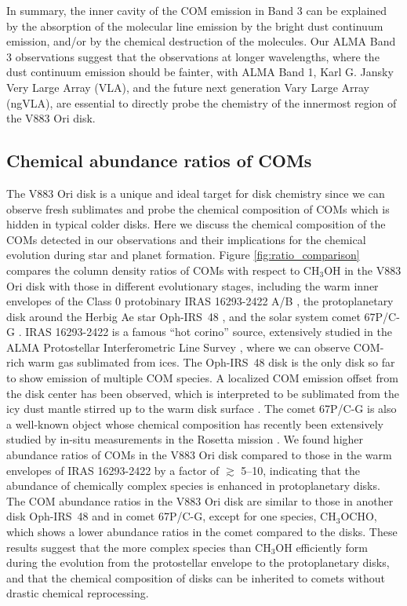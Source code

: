 \documentclass[linenumbers, twocolumn, twocolappendix, astrosymb, times]{aastex631}
\newcommand{\methanol}{CH$_3$OH\xspace}
\newcommand{\methylformate}{CH$_3$OCHO\xspace}
\begin{document}
In summary, the inner cavity of the COM emission in Band 3 can be explained by the absorption of the molecular line emission by the bright dust continuum emission, and/or by the chemical destruction of the molecules. Our ALMA Band 3 observations suggest that the observations at longer wavelengths, where the dust continuum emission should be fainter, with ALMA Band 1, Karl G. Jansky Very Large Array (VLA), and the future next generation Vary Large Array (ngVLA), are essential to directly probe the chemistry of the innermost region of the V883 Ori disk.

\subsection{Chemical abundance ratios of COMs}\label{subsec:abundance_ratio}
The V883 Ori disk is a unique and ideal target for disk chemistry since we can observe fresh sublimates and probe the chemical composition of COMs which is hidden in typical colder disks. Here we discuss the chemical composition of the COMs detected in our observations and their implications for the chemical evolution during star and planet formation. 
Figure \ref{fig:ratio_comparison} compares the column density ratios of COMs with respect to \methanol in the V883 Ori disk with those in different evolutionary stages, including the warm inner envelopes of the Class 0 protobinary IRAS 16293-2422 A/B \citep[][see also \citealt{Drozdovskaya2019}]{Lykke2017, Jorgensen2018, Manigand2020, Manigand2021}, the protoplanetary disk around the Herbig Ae star Oph-IRS~48 \citep{Brunken2022}, and the solar system comet 67P/C-G \citep[][see also \citealt{Drozdovskaya2019}]{Rubin2019, Schuhmann2019}. IRAS 16293-2422 is a famous ``hot corino'' source, extensively studied in the ALMA Protostellar Interferometric Line Survey \citep[PILS;][]{Jorgensen2016}, where we can observe COM-rich warm gas sublimated from ices. The Oph-IRS~48 disk is the only disk so far to show emission of multiple COM species. A localized COM emission offset from the disk center has been observed, which is interpreted to be sublimated from the icy dust mantle stirred up to the warm disk surface \citep{vanderMarel2021, Brunken2022}. The comet 67P/C-G is also a well-known object whose chemical composition has recently been extensively studied by in-situ measurements in the Rosetta mission \citep[e.g.,][]{Altwegg2019}. We found higher abundance ratios of COMs in the V883 Ori disk compared to those in the warm envelopes of IRAS 16293-2422 by a factor of $\gtrsim$ 5--10, indicating that the abundance of chemically complex species is enhanced in protoplanetary disks. The COM abundance ratios in the V883 Ori disk are similar to those in another disk Oph-IRS~48 and in comet 67P/C-G, except for one species, \methylformate, which shows a lower abundance ratios in the comet compared to the disks. These results suggest that the more complex species than \methanol efficiently form during the evolution from the protostellar envelope to the protoplanetary disks, and that the chemical composition of disks can be inherited to comets without drastic chemical reprocessing. 
\end{document}
